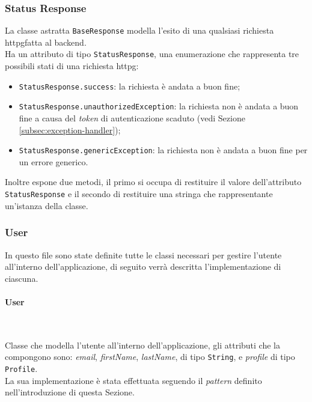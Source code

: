 \subsubsection*{Status Response}
\label{subsubsec:status-response}

La classe astratta \lstinline{BaseResponse} modella l'esito di una qualsiasi richiesta \gls{httpg}\glsoccur fatta al \gls{backend}\glsoccur. \\
Ha un attributo di tipo \lstinline{StatusResponse}, una enumerazione che rappresenta tre possibili stati di una richiesta \gls{httpg}\glsoccur:
\begin{itemize}
    \item \lstinline{StatusResponse.success}: la richiesta è andata a buon fine;
    \item \lstinline{StatusResponse.unauthorizedException}: la richiesta non è andata a buon fine a causa del \emph{token} di autenticazione scaduto (vedi Sezione \ref{subsec:exception-handler});
    \item \lstinline{StatusResponse.genericException}: la richiesta non è andata a buon fine per un errore generico.
\end{itemize}
Inoltre espone due metodi, il primo si occupa di restituire il valore dell'attributo \lstinline{StatusResponse} e il secondo di restituire una stringa che rappresentante un'istanza della classe.

\subsubsection*{User}
\label{subsubsec:user}

In questo file sono state definite tutte le classi necessari per gestire l'utente all'interno dell'applicazione, di seguito verrà descritta l'implementazione di ciascuna.

\paragraph*{User} ~ \\
\label{par:user}

\noindent Classe che modella l'utente all'interno dell'applicazione, gli attributi che la compongono sono: \emph{email}, \emph{firstName}, \emph{lastName}, di tipo \lstinline{String}, e \emph{profile} di tipo \lstinline{Profile}. \\
La sua implementazione è stata effettuata seguendo il \emph{pattern} definito nell'introduzione di questa Sezione.

